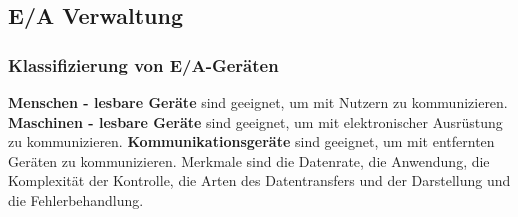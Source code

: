 \documentclass{article}
\begin{document}
\subsection{E/A Verwaltung}
\subsubsection{Klassifizierung von E/A-Geräten}
    \textbf{Menschen - lesbare Geräte} sind geeignet, um mit Nutzern zu kommunizieren.\newline
    \textbf{Maschinen - lesbare Geräte} sind geeignet, um mit elektronischer Ausrüstung zu kommunizieren.\newline
    \textbf{Kommunikationsgeräte} sind geeignet, um mit entfernten Geräten zu kommunizieren.\newline
    Merkmale sind die Datenrate, die Anwendung, die Komplexität der Kontrolle, die Arten des Datentransfers und der Darstellung und die Fehlerbehandlung.
\end{document}
